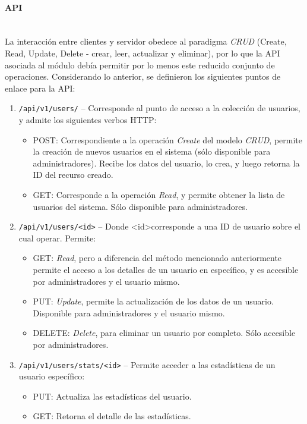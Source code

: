 \documentclass[11pt,letterpaper]{article}
\begin{document}
\paragraph{API\\\\}

La interacción entre clientes y servidor obedece al paradigma \emph{CRUD} (Create, Read, Update, Delete - crear, leer, actualizar y eliminar), por lo que la API asociada al módulo debía permitir por lo menos este reducido conjunto de operaciones. Considerando lo anterior, se definieron los siguientes puntos de enlace para la API:

\begin{enumerate}
    \item \texttt{/api/v1/users/} -- Corresponde al punto de acceso a la colección de usuarios, y admite los siguientes verbos HTTP:
    \begin{itemize}
        \item POST: Correspondiente a la operación \emph{Create} del modelo \emph{CRUD}, permite la creación de nuevos usuarios en el sistema (sólo disponible para administradores). Recibe los datos del usuario, lo crea, y luego retorna la ID del recurso creado.
        \item GET: Corresponde a la operación \emph{Read}, y permite obtener la lista de usuarios del sistema. Sólo disponible para administradores.
    \end{itemize}
    \item \texttt{/api/v1/users/\textless id\textgreater} -- Donde \textless id\textgreater corresponde a una ID de usuario sobre el cual operar. Permite:
    \begin{itemize}
        \item GET: \emph{Read}, pero a diferencia del método mencionado anteriormente permite el acceso a los detalles de un usuario en específico, y es accesible por administradores y el usuario mismo.
        \item PUT: \emph{Update}, permite la actualización de los datos de un usuario. Disponible para administradores y el usuario mismo.
        \item DELETE: \emph{Delete}, para eliminar un usuario por completo. Sólo accesible por administradores.
    \end{itemize}
    \item \texttt{/api/v1/users/stats/\textless id\textgreater} -- Permite acceder a las estadísticas de un usuario específico:
    \begin{itemize}
        \item PUT: Actualiza las estadísticas del usuario.
        \item GET: Retorna el detalle de las estadísticas.
    \end{itemize}
\end{enumerate}
\end{document}
